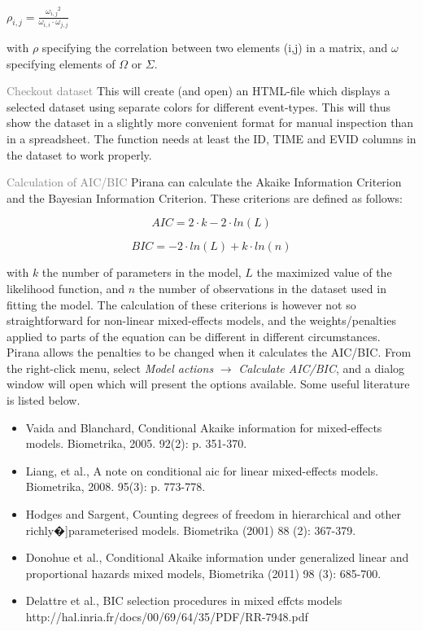 {{{{\begin {description}
\vspace{10pt}
$ \rho_{i,j} = \frac{{\omega_{i,j}}^2 }{\omega_{i,i} \cdot \omega_{j,j} }
$
\vspace{10pt}

with $\rho$ specifying the correlation between two elements (i,j) in a
matrix, and $\omega$ specifying elements of $\Omega$ or $\Sigma$.

  \item{\textcolor{Grey}{Checkout dataset}} This will create (and open)
an HTML-file which displays a selected dataset using separate colors for
different event-types. This will thus show the dataset in a slightly more
convenient format for manual inspection than in a spreadsheet. The
function needs at least the ID, TIME and EVID columns in the dataset to work properly.

  \item{\textcolor{Grey}{Calculation of AIC/BIC}} Pirana can calculate
    the Akaike Information Criterion and the Bayesian Information
    Criterion. These criterions are defined as follows:

\begin{equation}
AIC = 2 \cdot k - 2 \cdot ln(L)
\end{equation}

\begin{equation}
BIC = -2 \cdot ln(L) + k \cdot ln(n)
\end{equation}

with $k$ the number of parameters in the model, $L$ the maximized
value of the likelihood function, and $n$ the number of observations
in the dataset used in fitting the model. The calculation of these
criterions is however not so straightforward for non-linear mixed-effects
models, and the weights/penalties applied to parts of the equation can
be different in different circumstances. Pirana allows the penalties
to be changed when it calculates the AIC/BIC. From the right-click
menu, select \textit{Model actions} $\rightarrow$ \textit{Calculate
  AIC/BIC}, and a dialog window will open which will present the
options available. Some useful literature is listed below.

\scriptsize
\begin{itemize}
\item Vaida and Blanchard, Conditional Akaike information for
mixed-effects models. Biometrika, 2005. 92(2): p. 351-370.
\item Liang, et al., A note on conditional aic for linear
mixed-effects models. Biometrika, 2008. 95(3): p. 773-778.
\item Hodges and Sargent, Counting degrees of freedom in hierarchical
  and other richly�]parameterised models. Biometrika (2001) 88 (2): 367-379.
\item Donohue et al., Conditional Akaike information under generalized
  linear and proportional hazards mixed models, Biometrika (2011) 98
  (3): 685-700.
\item Delattre et al., BIC selection procedures in mixed effcts
  models \\ http://hal.inria.fr/docs/00/69/64/35/PDF/RR-7948.pdf
\end{itemize}
\normalsize


\end{description}}}}}
